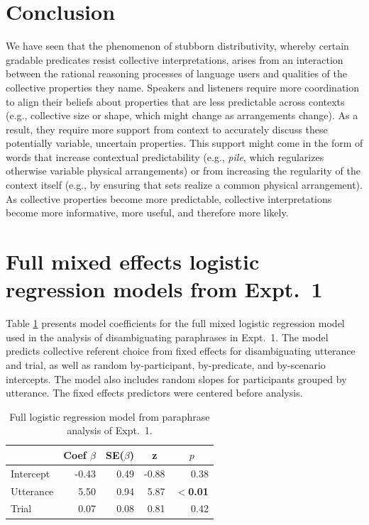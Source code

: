 \documentclass[linguex]{sp}
\begin{document}
\section{Conclusion}

We have seen that the phenomenon of stubborn distributivity, whereby certain gradable predicates resist collective interpretations, arises from an interaction between the rational reasoning processes of language users and qualities of the collective properties they name. Speakers and listeners require more coordination to align their beliefs about properties that are less predictable across contexts (e.g., collective size or shape, which might change as arrangements change). As a result, they require more support from context to accurately discuss these potentially variable, uncertain properties. This support might come in the form of words that increase contextual predictability (e.g., \emph{pile}, which regularizes otherwise variable physical arrangements) or from increasing the regularity of the context itself (e.g., by ensuring that sets realize a common physical arrangement). As collective properties become more predictable, collective interpretations become more informative, more useful, and therefore more likely.


\appendix

\section{Full mixed effects logistic regression models from Expt.~1}\label{expt1results}


Table \ref{expt1analysis1} presents model coefficients for the full mixed logistic regression model used in the analysis of disambiguating paraphrases in Expt.~1. The model predicts collective referent choice from fixed effects for disambiguating utterance and trial, as well as random by-participant, by-predicate, and by-scenario intercepts. The model also includes random slopes for participants grouped by utterance. The fixed effects predictors were centered before analysis.

\begin{table}[h!] 
	\centering \caption{Full logistic regression model from paraphrase analysis of Expt.~1.} \label{expt1analysis1}
\begin{tabular}{lrrrr}\toprule
	&	Coef $\beta$	&	SE($\beta$)	&	\multicolumn{1}{c}{ \textbf{z}}	&	\multicolumn{1}{c}{$p$}\\ \midrule
Intercept	&	-0.43	&	0.49	&	-0.88	&	0.38\\
Utterance	&	5.50	&	0.94	&	5.87	&	\textbf{$<$0.01}\\
Trial	&	0.07	&	0.08	&	0.81	&	0.42\\
\bottomrule
\end{tabular}
\end{table}
\end{document}
